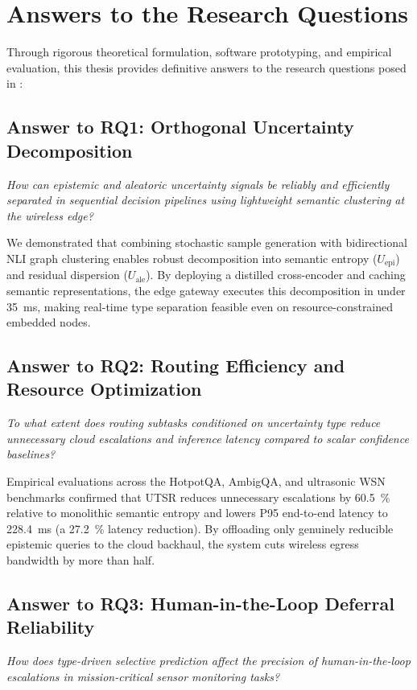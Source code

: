 \section{Answers to the Research Questions}
\label{sec:concl_answers}

Through rigorous theoretical formulation, software prototyping, and empirical evaluation, this thesis provides definitive answers to the research questions posed in :

\subsection*{Answer to RQ1: Orthogonal Uncertainty Decomposition}
\textit{How can epistemic and aleatoric uncertainty signals be reliably and efficiently separated in sequential decision pipelines using lightweight semantic clustering at the wireless edge?}

We demonstrated that combining stochastic sample generation with bidirectional \ac{NLI} graph clustering enables robust decomposition into semantic entropy ($U_{\text{epi}}$) and residual dispersion ($U_{\text{ale}}$). By deploying a distilled cross-encoder and caching semantic representations, the edge gateway executes this decomposition in under \SI{35}{\milli\second}, making real-time type separation feasible even on resource-constrained embedded nodes.

\subsection*{Answer to RQ2: Routing Efficiency and Resource Optimization}
\textit{To what extent does routing subtasks conditioned on uncertainty type reduce unnecessary cloud escalations and inference latency compared to scalar confidence baselines?}

Empirical evaluations across the HotpotQA, AmbigQA, and ultrasonic WSN benchmarks confirmed that \ac{UTSR} reduces unnecessary escalations by \SI{60.5}{\percent} relative to monolithic semantic entropy and lowers P95 end-to-end latency to \SI{228.4}{\milli\second} (a \SI{27.2}{\percent} latency reduction). By offloading only genuinely reducible epistemic queries to the cloud backhaul, the system cuts wireless egress bandwidth by more than half.

\subsection*{Answer to RQ3: Human-in-the-Loop Deferral Reliability}
\textit{How does type-driven selective prediction affect the precision of human-in-the-loop escalations in mission-critical sensor monitoring tasks?}

